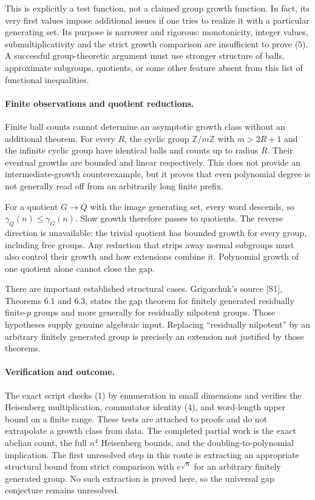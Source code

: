 \documentclass[11pt]{article}
\begin{document}
This is explicitly a test function, not a claimed group growth function. In fact, its very first values impose additional issues if one tries to realize it with a particular generating set. Its purpose is narrower and rigorous: monotonicity, integer values, submultiplicativity and the strict growth comparison are insufficient to prove (5). A successful group-theoretic argument must use stronger structure of balls, approximate subgroups, quotients, or some other feature absent from this list of functional inequalities.

\paragraph{Finite observations and quotient reductions.}
Finite ball counts cannot determine an asymptotic growth class without an additional theorem. For every $R$, the cyclic group $\mathbb Z/m\mathbb Z$ with $m>2R+1$ and the infinite cyclic group have identical balls and counts up to radius $R$. Their eventual growths are bounded and linear respectively. This does not provide an intermediate-growth counterexample, but it proves that even polynomial degree is not generally read off from an arbitrarily long finite prefix.

For a quotient $G\to Q$ with the image generating set, every word descends, so $\gamma_Q(n)\le\gamma_G(n)$. Slow growth therefore passes to quotients. The reverse direction is unavailable: the trivial quotient has bounded growth for every group, including free groups. Any reduction that strips away normal subgroups must also control their growth and how extensions combine it. Polynomial growth of one quotient alone cannot close the gap.

There are important established structural cases. Grigorchuk's source [S1], Theorems 6.1 and 6.3, states the gap theorem for finitely generated residually finite-$p$ groups and more generally for residually nilpotent groups. Those hypotheses supply genuine algebraic input. Replacing ``residually nilpotent'' by an arbitrary finitely generated group is precisely an extension not justified by those theorems.

\paragraph{Verification and outcome.}
The exact script checks (1) by enumeration in small dimensions and verifies the Heisenberg multiplication, commutator identity (4), and word-length upper bound on a finite range. These tests are attached to proofs and do not extrapolate a growth class from data. The completed partial work is the exact abelian count, the full $n^4$ Heisenberg bounds, and the doubling-to-polynomial implication. The first unresolved step in this route is extracting an appropriate structural bound from strict comparison with $e^{\sqrt n}$ for an arbitrary finitely generated group. No such extraction is proved here, so the universal gap conjecture remains unresolved.
\end{document}
